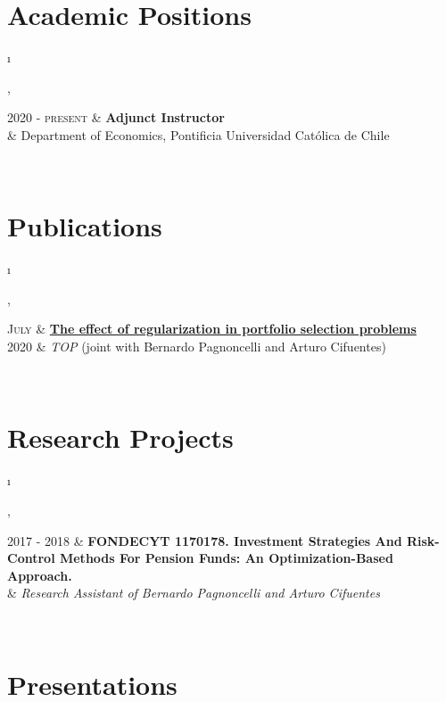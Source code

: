 \documentclass[a4paper, margins=2cm,10pt]{article}
\newcommand{\tablength}{}
\newcommand{\setTabParams}[1]{\renewcommand\tablength{}\forcsvlist{\listadd\tablength}{#1}}
\newcommand{\setCols}[1]{			%
	\ifnum0=\i						%
		\ifdim0cm=#1				%
			\def \firstCol {r}		%
		\else						%
			\def \firstCol {p{#1}}		%
		\fi						%
	\else \ifnum1=\i				%
		\ifdim0cm=#1				%
			\def \secondCol {l}		%
		\else						%
			\def \secondCol{p{#1}}	%
		\fi						%
	\else \ifnum2=\i				%
		\ifnum0=#1				%
			\def \sep {}			%
		\else						%
			\def \sep {|}			%
		\fi						%
	\fi \fi \fi						%
	\advance\i by1					%
}
\newcommand{\tab}[1]{					%
	\newcount\i						%
	\forlistloop{\setCols}{\tablength}		%
	\begin{tabular}{\firstCol \sep \secondCol}	%
		#1							%
	\end{tabular} \\						%
}
\begin{document}
\section{Academic Positions}
\setTabParams{0cm,11cm,1}

\tab{
\textsc{2020 - present}
 	&	\textbf{Adjunct Instructor}	\\[0.2ex]
	&	Department of Economics, Pontificia Universidad Católica de Chile
}

\section{Publications}
\setTabParams{0cm,11cm,1}

\tab{
\textsc{July}	&	\href{http://links.springernature.com/f/a/UOaM73CHGS-A0wxcwW1Zhw~~/AABE5gA~/RgRg_rc5P0QwaHR0cDovL3d3dy5zcHJpbmdlci5jb20vLS8yL0FYT0xTb2g2NTh5YXNfWm11RW9KVwNzcGNCCgBIuYMdXwAuny5SG2Jlcm5hcmRvLnBhZ25vbmNlbGxpQHVhaS5jbFgEAAAG5w~~}{\textbf{The effect of regularization in portfolio selection problems}} \\[0.2ex]
\textsc{2020}	&	\textit{TOP} (joint with Bernardo Pagnoncelli and Arturo Cifuentes)
}

%


\section{Research Projects}
\setTabParams{0cm,11cm,1}

\tab{
\textsc{2017 - 2018}
 	&	\textbf{FONDECYT 1170178. Investment Strategies And Risk-Control Methods For Pension Funds: An Optimization-Based Approach.} \\[0.2ex]
	&	\emph{Research Assistant of Bernardo Pagnoncelli and Arturo Cifuentes}
}

\section{Presentations}
\setTabParams{0cm,11cm,1}
\end{document}
